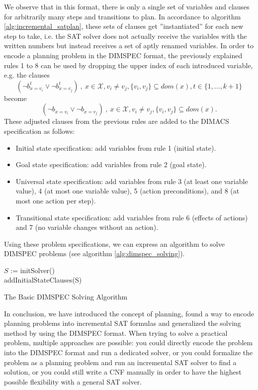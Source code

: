 \documentclass{article}
\theoremstyle{definition}
\begin{document}
\noindent We observe that in this format, there is only a single set of variables and clauses for arbitrarily many steps and transitions to plan. In accordance to algorithm \ref{alg:incremental_satplan}, these sets of clauses get ''instantiated'' for each new step to take, i.e. the SAT solver does not actually receive the variables with the written numbers but instead receives a set of aptly renamed variables. In order to encode a planning problem in the DIMSPEC format, the previously explained rules 1 to 8 can be used by dropping the upper index of each introduced variable, e.g. the clauses \[(\neg b_{x=v_i}^t \vee \neg b_{x=v_j}^t)\ ,\ x \in \mathcal{X}, v_i \neq v_j, \{v_i,v_j\} \subseteq \textit{dom}(x), t \in \{1,\dots,k+1\}\] become \[(\neg b_{x=v_i} \vee \neg b_{x=v_j})\ ,\ x \in \mathcal{X}, v_i \neq v_j, \{v_i,v_j\} \subseteq \textit{dom}(x).\] These adjusted clauses from the previous rules are added to the DIMACS specification as follows:

\begin{itemize}
\item Initial state specification: add variables from rule 1 (initial state).
\item Goal state specification: add variables from rule 2 (goal state).
\item Universal state specification: add variables from rule 3 (at least one variable value), 4 (at most one variable value), 5 (action preconditions), and 8 (at most one action per step).
\item Transitional state specification: add variables from rule 6 (effects of actions) and 7 (no variable changes without an action).
\end{itemize}

\noindent Using these problem specifications, we can express an algorithm to solve DIMSPEC problems (see algorithm \ref{alg:dimspec_solving}).

\begin{algorithm}[h]
$S$ := initSolver()\\
addInitialStateClauses(S)\\
\caption{The Basic DIMSPEC Solving Algorithm}
\label{alg:dimspec_solving}
\end{algorithm}

In conclusion, we have introduced the concept of planning, found a way to encode planning problems into incremental SAT formulas and generalized the solving method by using the DIMSPEC format. When trying to solve a practical problem, multiple approaches are possible: you could directly encode the problem into the DIMSPEC format and run a dedicated solver, or you could formalize the problem as a planning problem and run an incremental SAT solver to find a solution, or you could still write a CNF manually in order to have the highest possible flexibility with a general SAT solver.
\end{document}
